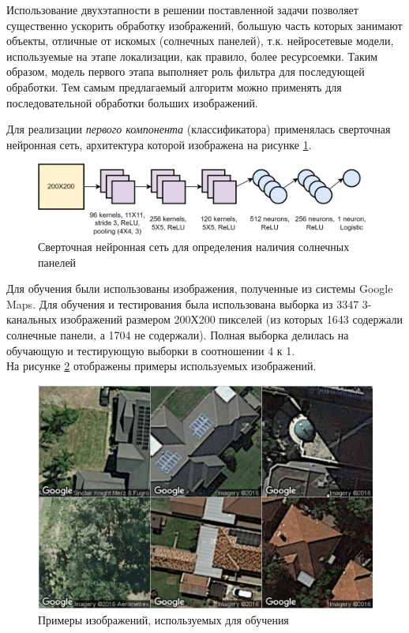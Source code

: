 \documentclass{thesisby}
\begin{document}
Использование двухэтапности в решении поставленной задачи позволяет существенно ускорить обработку изображений, большую часть которых занимают объекты, отличные от искомых (солнечных панелей), т.к. нейросетевые модели, используемые на этапе локализации, как правило, более ресурсоемки. Таким образом, модель первого этапа выполняет роль фильтра для последующей обработки. Тем самым предлагаемый алгоритм можно применять для последовательной обработки больших изображений.

Для реализации \textit{первого компонента} (классификатора) применялась сверточная нейронная сеть, архитектура которой изображена на рисунке \ref{fig:used_cnn}.
 
\begin{figure}[ht]
	\centering
	\includegraphics[width=17cm]{man-source/images/ch4/pic4-19.png}
	\caption{Сверточная нейронная сеть для определения наличия солнечных панелей}
	\label{fig:used_cnn}
\end{figure}

Для обучения были использованы изображения, полученные из системы Google Maps. Для обучения и тестирования была использована выборка из 3347 3-канальных изображений размером 200Х200 пикселей (из которых 1643 содержали солнечные панели, а 1704 не содержали). Полная выборка делилась на обучающую и тестирующую выборки в соотношении 4 к 1.\\
На рисунке \ref{fig:google_maps} отображены примеры используемых изображений.
 
\begin{figure}[ht]
	\centering
	\includegraphics[width=12cm]{man-source/images/ch4/pic4-17.png}
	\caption{Примеры изображений, используемых для обучения}
	\label{fig:google_maps}
\end{figure}
\end{document}

